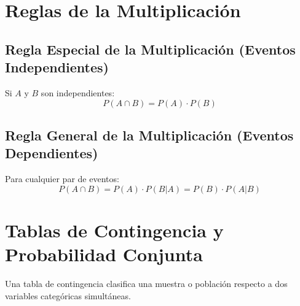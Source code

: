 \section{Reglas de la Multiplicación}

\subsection{Regla Especial de la Multiplicación (Eventos Independientes)}
Si $A$ y $B$ son independientes:
\begin{equation}
    P(A \cap B) = P(A) \cdot P(B)
\end{equation}

\subsection{Regla General de la Multiplicación (Eventos Dependientes)}
Para cualquier par de eventos:
\begin{equation}
    P(A \cap B) = P(A) \cdot P(B|A) = P(B) \cdot P(A|B)
\end{equation}

\section{Tablas de Contingencia y Probabilidad Conjunta}
Una tabla de contingencia clasifica una muestra o población respecto a dos variables categóricas simultáneas.

